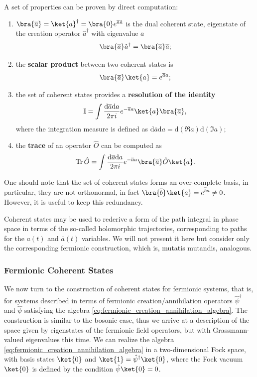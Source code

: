 A set of properties can be proven by direct computation:
\begin{enumerate}
    \item \(\bra{\overline{a}} = \ket{a}^\dagger = \bra{0} e^{\overline{a} \hat{a}}\) is the dual coherent state, eigenstate of the creation operator \(\hat{a}^\dagger\) with eigenvalue \(\overline{a}\)
          \[
              \bra{\overline{a}} \hat{a}^\dagger = \bra{\overline{a}} \overline{a};
          \]
    \item the \textbf{scalar product} between two coherent states is
          \[
              \bra{\overline{a}} \ket{a} = e^{\overline{a} a};
          \]
    \item the set of coherent states provides a \textbf{resolution of the identity}
          \[
              \mathbb{I} = \int \frac{\mathrm{d} \overline{a} \mathrm{d} a}{2\pi i} e^{-\overline{a} a} \ket{a} \bra{\overline{a}},
          \]
          where the integration measure is defined as \(\mathrm{d} \overline{a} \mathrm{d} a = \mathrm{d} (\Re a) \mathrm{d} (\Im a)\);
    \item the \textbf{trace} of an operator \(\hat{O}\) can be computed as
          \[
              \text{Tr}\, \hat{O} = \int \frac{\mathrm{d} \overline{a} \mathrm{d} a}{2\pi i} e^{-\overline{a} a} \bra{\overline{a}} \hat{O} \ket{a}.
          \]
\end{enumerate}
One should note that the set of coherent states forms an over-complete basis, in particular, they are not orthonormal, in fact \(\bra{\overline{b}}\ket{a} = e^{\overline{b} a} \neq 0\). However, it is useful to keep this redundancy.

Coherent states may be used to rederive a form of the path integral in phase space in terms of the so-called holomorphic trajectories, corresponding to paths for the \(a(t)\) and \(\overline{a}(t)\) variables. We will not present it here but consider only the corresponding fermionic construction, which is, mutatis mutandis, analogous.

\subsubsection{Fermionic Coherent States}

We now turn to the construction of coherent states for fermionic systems, that is, for systems described in terms of fermionic creation/annihilation operators \(\hat{\psi}^\dagger\) and \(\hat{\psi}\) satisfying the algebra \eqref{eq:fermionic_creation_annihilation_algebra}. The construction is similar to the bosonic case, thus we arrive at a description of the space given by eigenstates of the fermionic field operators, but with Grassmann-valued eigenvalues this time. We can realize the algebra \eqref{eq:fermionic_creation_annihilation_algebra} in a two-dimensional Fock space, with basis states \(\ket{0}\) and \(\ket{1} = \hat{\psi}^\dagger \ket{0}\), where the Fock vacuum \(\ket{0}\) is defined by the condition \(\hat{\psi} \ket{0} = 0\).

